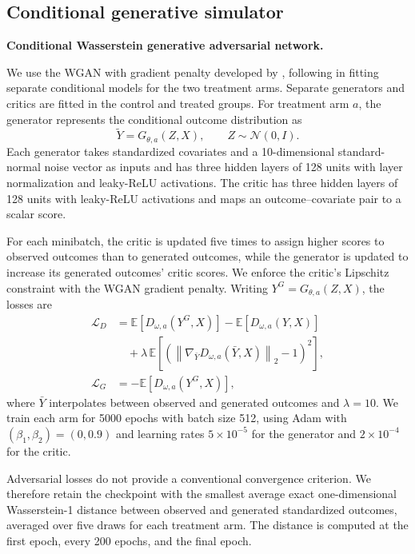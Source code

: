 \begin{landscape}
\subsection{Conditional generative simulator}

\noindent\textbf{Conditional Wasserstein generative adversarial network.}

We use the WGAN with gradient penalty developed by , following  in fitting separate conditional models for the two treatment arms. Separate generators and critics are fitted in the control and treated groups. For treatment arm \(a\), the generator represents the conditional outcome distribution as
\[
\widetilde Y
=
G_{\theta,a}(Z,X),
\qquad
Z\sim\mathcal N(0,I).
\]
Each generator takes standardized covariates and a 10-dimensional standard-normal noise vector as inputs and has three hidden layers of 128 units with layer normalization and leaky-ReLU activations. The critic has three hidden layers of 128 units with leaky-ReLU activations and maps an outcome--covariate pair to a scalar score.

For each minibatch, the critic is updated five times to assign higher scores to observed outcomes than to generated outcomes, while the generator is updated to increase its generated outcomes' critic scores. We enforce the critic's Lipschitz constraint with the WGAN gradient penalty. Writing \(Y^G=G_{\theta,a}(Z,X)\), the losses are
\[
\begin{aligned}
\mathcal L_D
&=
\mathbb E\!\left[D_{\omega,a}(Y^G,X)\right]
-\mathbb E\!\left[D_{\omega,a}(Y,X)\right]\\
&\quad+\lambda\,
\mathbb E\!\left[\left(\left\lVert\nabla_{\bar Y}D_{\omega,a}(\bar Y,X)\right\rVert_2-1\right)^2\right],\\
\mathcal L_G
&=-\mathbb E\!\left[D_{\omega,a}(Y^G,X)\right],
\end{aligned}
\]
where \(\bar Y\) interpolates between observed and generated outcomes and \(\lambda=10\). We train each arm for 5000 epochs with batch size 512, using Adam with \((\beta_1,\beta_2)=(0,0.9)\) and learning rates \(5\times10^{-5}\) for the generator and \(2\times10^{-4}\) for the critic.

Adversarial losses do not provide a conventional convergence criterion. We therefore retain the checkpoint with the smallest average exact one-dimensional Wasserstein-1 distance between observed and generated standardized outcomes, averaged over five draws for each treatment arm. The distance is computed at the first epoch, every 200 epochs, and the final epoch.


\end{landscape}
